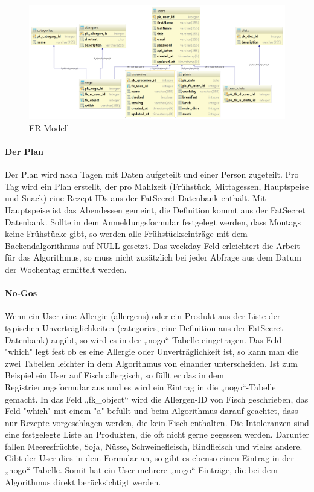 \begin{figure}[hb]
\centering
\includegraphics{threesixfive.png}
\caption{ER-Modell}
\end{figure}

\paragraph{Der Plan}
Der Plan wird nach Tagen mit Daten aufgeteilt und einer Person zugeteilt. Pro Tag wird ein Plan erstellt, der pro Mahlzeit (Frühstück, Mittagessen, Hauptspeise und Snack) eine Rezept-IDs aus der FatSecret Datenbank enthält. Mit Hauptspeise ist das Abendessen gemeint, die Definition kommt aus der FatSecret Datenbank.
Sollte in dem Anmeldungsformular festgelegt werden, dass Montags keine Frühstücke gibt, so werden alle Frühstückseinträge mit dem Backendalgorithmus auf NULL gesetzt. Das weekday-Feld erleichtert die Arbeit für das Algorithmus, so muss nicht zusätzlich bei jeder Abfrage aus dem Datum der Wochentag ermittelt werden. 

\paragraph{No-Gos}
Wenn ein User eine Allergie (allergens) oder ein Produkt aus der Liste der typischen Unverträglichkeiten (categories, eine Definition aus der FatSecret Datenbank) angibt, so wird es in der „nogo“-Tabelle eingetragen. Das Feld "which" legt fest ob es eine Allergie oder Unverträglichkeit ist, so kann man die zwei Tabellen leichter in dem Algorithmus von einander unterscheiden. Ist zum Beispiel ein User auf Fisch allergisch, so füllt er das in dem Registrierungsformular aus und es wird ein Eintrag in die „nogo“-Tabelle gemacht. In das Feld „fk\_object“  wird die Allergen-ID von Fisch geschrieben, das Feld "which" mit einem "a" befüllt und beim Algorithmus darauf geachtet, dass nur Rezepte vorgeschlagen werden, die kein Fisch enthalten. Die Intoleranzen sind eine festgelegte Liste an Produkten, die oft nicht gerne gegessen werden. Darunter fallen Meeresfrüchte, Soja, Nüsse, Schweinefleisch, Rindfleisch und vieles andere. Gibt der User dies in dem Formular an, so gibt es ebenso einen Eintrag in der „nogo“-Tabelle. Somit hat ein User mehrere „nogo“-Einträge, die bei dem Algorithmus direkt berücksichtigt werden.
